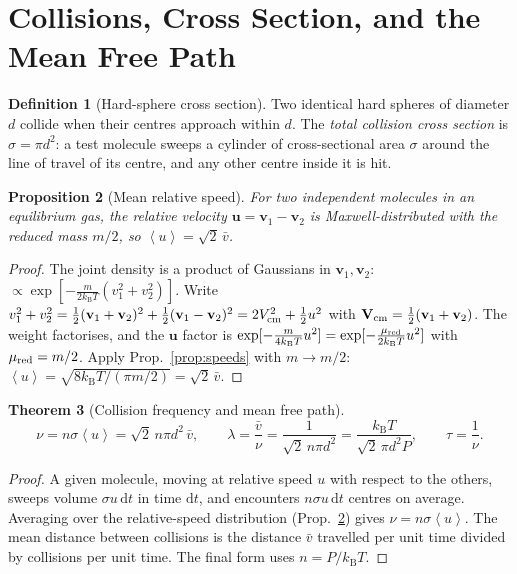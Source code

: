 \documentclass[11pt,a4paper]{report}
\theoremstyle{definition}
\newtheorem{definition}{Definition}[chapter]
\theoremstyle{plain}
\newtheorem{proposition}[definition]{Proposition}
\newtheorem{theorem}[definition]{Theorem}
\newcommand{\kB}{k_{\mathrm{B}}}
\newcommand{\dd}{\mathrm{d}}
\newcommand{\avg}[1]{\left\langle #1\right\rangle}
\newcommand{\vv}{\mathbf{v}}
\newcommand{\vbar}{\bar{v}}
\begin{document}
\section{Collisions, Cross Section, and the Mean Free Path}
\label{sec:mfp}

\begin{definition}[Hard-sphere cross section]
Two identical hard spheres of diameter $d$ collide when their centres approach within $d$. The \emph{total collision cross section} is $\sigma=\pi d^2$: a test molecule sweeps a cylinder of cross-sectional area $\sigma$ around the line of travel of its centre, and any other centre inside it is hit.
\end{definition}

\begin{proposition}[Mean relative speed]\label{prop:vrel}
For two independent molecules in an equilibrium gas, the relative velocity $\mathbf u=\vv_1-\vv_2$ is Maxwell-distributed with the reduced mass $m/2$, so $\avg{u}=\sqrt2\,\vbar$.
\end{proposition}
\begin{proof}
The joint density is a product of Gaussians in $\vv_1,\vv_2$: $\propto\exp[-\tfrac{m}{2\kB T}(v_1^2+v_2^2)]$. Write $v_1^2+v_2^2=\tfrac12(\vv_1+\vv_2)^2+\tfrac12(\vv_1-\vv_2)^2=2V_{\rm cm}^2+\tfrac12u^2$ with $\mathbf V_{\rm cm}=\tfrac12(\vv_1+\vv_2)$. The weight factorises, and the $\mathbf u$ factor is $\exp[-\tfrac{m}{4\kB T}u^2]=\exp[-\tfrac{\mu_{\rm red}}{2\kB T}u^2]$ with $\mu_{\rm red}=m/2$. Apply Prop.~\ref{prop:speeds} with $m\to m/2$: $\avg u=\sqrt{8\kB T/(\pi m/2)}=\sqrt2\,\vbar$.
\end{proof}

\begin{theorem}[Collision frequency and mean free path]\label{thm:mfp}
\begin{equation}
\nu=n\sigma\avg u=\sqrt2\,n\pi d^2\,\vbar,\qquad
\lambda=\frac{\vbar}{\nu}=\frac{1}{\sqrt2\,n\pi d^2}=\frac{\kB T}{\sqrt2\,\pi d^2P},\qquad\tau=\frac1\nu .
\label{eq:mfp}
\end{equation}
\end{theorem}
\begin{proof}
A given molecule, moving at relative speed $u$ with respect to the others, sweeps volume $\sigma u\,\dd t$ in time $\dd t$, and encounters $n\sigma u\,\dd t$ centres on average. Averaging over the relative-speed distribution (Prop.~\ref{prop:vrel}) gives $\nu=n\sigma\avg u$. The mean distance between collisions is the distance $\vbar$ travelled per unit time divided by collisions per unit time. The final form uses $n=P/\kB T$.
\end{proof}
\end{document}
